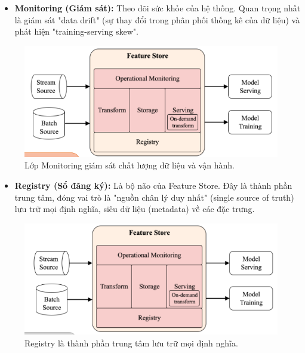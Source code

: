 \documentclass[11pt]{article}
\begin{document}
\begin{itemize}
    \item \textbf{Monitoring (Giám sát):} Theo dõi sức khỏe của hệ thống. Quan trọng nhất là giám sát "data drift" (sự thay đổi trong phân phối thống kê của dữ liệu) và phát hiện "training-serving skew".
\end{itemize}
\begin{figure}[H]
    \centering
    \includegraphics[width=0.7\linewidth]{images/monitor_feast.png}
    \caption{Lớp Monitoring giám sát chất lượng dữ liệu và vận hành.}
\end{figure}

\begin{itemize}
    \item \textbf{Registry (Sổ đăng ký):} Là bộ não của Feature Store. Đây là thành phần trung tâm, đóng vai trò là "nguồn chân lý duy nhất" (single source of truth) lưu trữ mọi định nghĩa, siêu dữ liệu (metadata) về các đặc trưng.
\end{itemize}
\begin{figure}[H]
    \centering
    \includegraphics[width=0.7\linewidth]{images/registry_features.png}
    \caption{Registry là thành phần trung tâm lưu trữ mọi định nghĩa.}
\end{figure}
\end{document}
